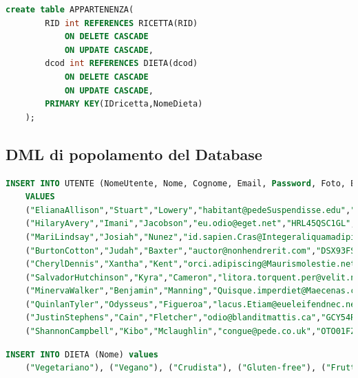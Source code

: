 \documentclass[12pt]{extarticle}
\begin{document}
\begin{lstlisting}[language=SQL]
    create table APPARTENENZA(
        RID int REFERENCES RICETTA(RID)
            ON DELETE CASCADE
            ON UPDATE CASCADE,
        dcod int REFERENCES DIETA(dcod)
            ON DELETE CASCADE
            ON UPDATE CASCADE,
        PRIMARY KEY(IDricetta,NomeDieta)
    );
\end{lstlisting}
    

\subsection{DML di popolamento del Database}


\begin{lstlisting}[language=SQL]
    INSERT INTO UTENTE (NomeUtente, Nome, Cognome, Email, Password, Foto, Biografia, Tipo)
    VALUES 
    ("ElianaAllison","Stuart","Lowery","habitant@pedeSuspendisse.edu","AWU62MHK1NR","foto,jpg"),
    ("HilaryAvery","Imani","Jacobson","eu.odio@eget.net","HRL45QSC1GL","foto,jpg"),
    ("MariLindsay","Josiah","Nunez","id.sapien.Cras@Integeraliquamadipiscing.com","BKY88PKL4QD","foto,jpg"),
    ("BurtonCotton","Judah","Baxter","auctor@nonhendrerit.com","DSX93FSX1KC","foto,jpg"),
    ("CherylDennis","Xantha","Kent","orci.adipiscing@Maurismolestie.net","XJS15KWY0DG","foto,jpg"),
    ("SalvadorHutchinson","Kyra","Cameron","litora.torquent.per@velit.net","OTW70TLU3IE","foto,jpg"),
    ("MinervaWalker","Benjamin","Manning","Quisque.imperdiet@Maecenas.co.uk","SIM54ERX2RJ","foto,jpg"),
    ("QuinlanTyler","Odysseus","Figueroa","lacus.Etiam@eueleifendnec.net","CST81RSQ1WQ","foto,jpg"),
    ("JustinStephens","Cain","Fletcher","odio@blanditmattis.ca","GCY54RVO5UW","foto,jpg"),
    ("ShannonCampbell","Kibo","Mclaughlin","congue@pede.co.uk","OTO01FZT2XA","foto,jpg")
\end{lstlisting}

\begin{lstlisting}[language=SQL]
    INSERT INTO DIETA (Nome) values
    ("Vegetariano"), ("Vegano"), ("Crudista"), ("Gluten-free"), ("Fruttariano");
\end{lstlisting}
\end{document}
